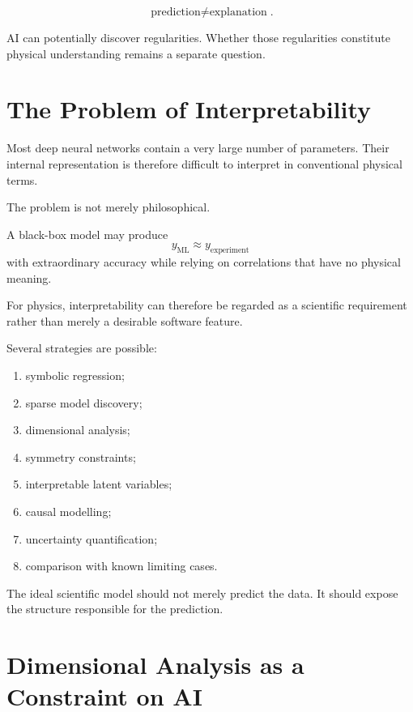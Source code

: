 \documentclass[11pt,a4paper]{article}
\begin{document}
\begin{equation}
\boxed{
\text{prediction}\neq\text{explanation}
}.
\end{equation}

AI can potentially discover regularities. Whether those regularities constitute
physical understanding remains a separate question.

\section{The Problem of Interpretability}

Most deep neural networks contain a very large number of parameters. Their
internal representation is therefore difficult to interpret in conventional
physical terms.

The problem is not merely philosophical.

A black-box model may produce
\begin{equation}
y_{\mathrm{ML}}\approx y_{\mathrm{experiment}}
\end{equation}
with extraordinary accuracy while relying on correlations that have no physical
meaning.

For physics, interpretability can therefore be regarded as a scientific
requirement rather than merely a desirable software feature.

Several strategies are possible:

\begin{enumerate}
\item symbolic regression;
\item sparse model discovery;
\item dimensional analysis;
\item symmetry constraints;
\item interpretable latent variables;
\item causal modelling;
\item uncertainty quantification;
\item comparison with known limiting cases.
\end{enumerate}

The ideal scientific model should not merely predict the data. It should expose
the structure responsible for the prediction.

\section{Dimensional Analysis as a Constraint on AI}
\end{document}
